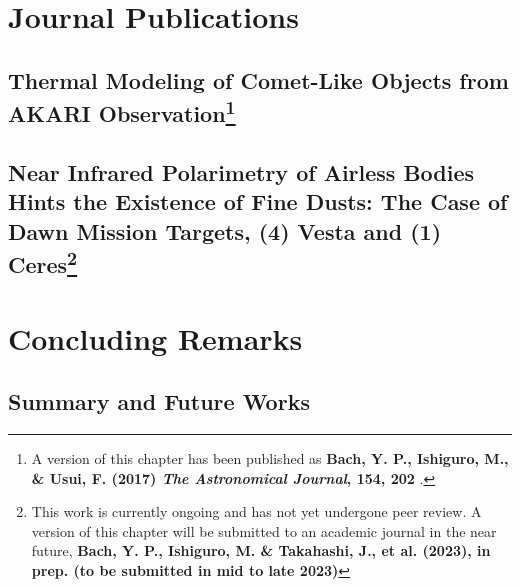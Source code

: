 \documentclass[12pt]{report}
\begin{document}
\part{Journal Publications}\label{part-publications}
\chapter[Thermal Modeling of Comet-Like Objects from AKARI Observation]{Thermal Modeling of Comet-Like Objects from AKARI Observation\footnote{A version of this chapter has been published as \textbf{Bach, Y. P., Ishiguro, M., \& Usui, F. (2017) \textit{The Astronomical Journal}, 154, 202} \citep{2017AJ....154..202B}.}}\label{c:akari}


\chapter[Near Infrared Polarimetry of Airless Bodies Hints the Existence of Fine Dusts: The Case of Dawn Mission Targets, (4) Vesta and (1) Ceres]{Near Infrared Polarimetry of Airless Bodies Hints the Existence of Fine Dusts: The Case of Dawn Mission Targets, (4) Vesta and (1) Ceres\footnote{This work is currently ongoing and has not yet undergone peer review. A version of this chapter will be submitted to an academic journal in the near future, \textbf{Bach, Y. P., Ishiguro, M. \& Takahashi, J., et al. (2023), in prep. (to be submitted in mid to late 2023)}}}\label{c:nirpol}


\part{Concluding Remarks}\label{part-conclusion}
\chapter{Summary and Future Works}\label{c:summary}





\clearpage
{}



%
\end{document}
